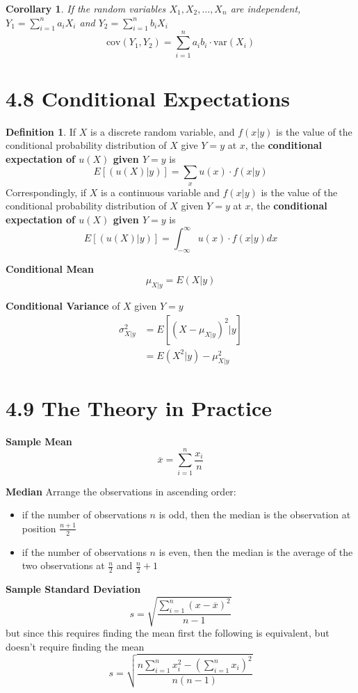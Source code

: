 \documentclass[
10pt,reqno
]{amsart}
\newtheorem{corollary}{Corollary}[section]
\theoremstyle{definition}
\newtheorem{definition}{Definition}[section]
\begin{document}
\begin{corollary}
If the random variables \(X_1, X_2,\ldots,X_n\) are independent, \(Y_1=\sum_{i=1}^n a_i X_i\) and \(Y_2=\sum_{i=1}^n b_i X_i\)
\[
\text{cov}(Y_1, Y_2)=\sum_{i=1}^n a_i b_i \cdot \text{var}(X_i)
\]
\end{corollary}

\section*{4.8 Conditional Expectations}

\begin{definition}
If \(X\) is a discrete random variable, and \(f(x|y)\) is the value of the conditional probability distribution of \(X\) give \(Y=y\) at \(x\), the \textbf{conditional expectation of \(u(X)\) given \(Y=y\)} is
\[
E[(u(X)|y)]=\sum_x u(x)\cdot f(x|y)
\]
Correspondingly, if \(X\) is a continuous variable and \(f(x|y)\) is the value of the conditional probability distribution of \(X\) given \(Y=y\) at \(x\), the \textbf{conditional expectation of \(u(X)\) given \(Y=y\)} is
\[
E[(u(X)|y)]=\int_{- \infty}^{\infty} u(x)\cdot f(x|y)dx
\]
\end{definition}

\textbf{Conditional Mean}
\[
\mu_{X|y}=E(X|y)
\]

\textbf{Conditional Variance}
of \(X\) given \(Y=y\)
\begin{align*}
\sigma_{X|y}^2&=E[(X - \mu_{X|y})^2|y]\\
&=E(X^2|y)-\mu_{X|y}^2
\end{align*}

\section*{4.9 The Theory in Practice}

\textbf{Sample Mean}
\[
\overline{x}=\sum_{i=1}^n \frac{x_i}{n}
\]

\textbf{Median} Arrange the observations in ascending order:
\begin{itemize}
	\item if the number of observations \(n\) is odd, then the median is the observation at position \(\frac{n+1}{2}\)
	\item if the number of observations \(n\) is even, then the median is the average of the two observations at
  \(\frac{n}{2}\) and \(\frac{n}{2} + 1\)
\end{itemize}

\textbf{Sample Standard Deviation}
\[
s=\sqrt{\frac{\sum_{i=1}^n (x-\overline{x})^2}{n-1}}
\]
but since this requires finding the mean first the following is equivalent, but doesn't require finding the mean
\[
s=\sqrt{\frac{n\sum_{i=1}^n x_i^2-(\sum_{i=1}^n x_i)^2}{n(n-1)}}
\]
\end{document}
